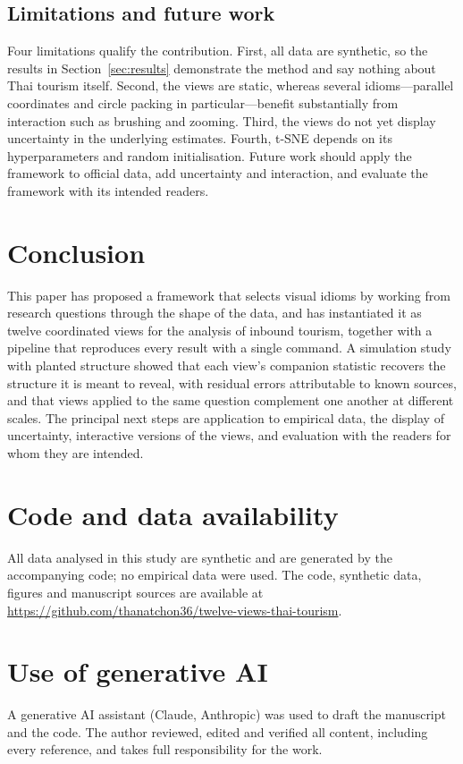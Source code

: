 \documentclass[11pt,a4paper]{article}
\begin{document}
\subsection{Limitations and future work}
Four limitations qualify the contribution. First, all data are synthetic, so the results in
Section~\ref{sec:results} demonstrate the method and say nothing about Thai tourism itself. Second, the views
are static, whereas several idioms---parallel coordinates and circle packing in particular---benefit
substantially from interaction such as brushing and zooming. Third, the views do not yet display uncertainty
in the underlying estimates. Fourth, t-SNE depends on its hyperparameters and random initialisation. Future
work should apply the framework to official data, add uncertainty and interaction, and evaluate the framework
with its intended readers.

\section{Conclusion}\label{sec:conclusion}

This paper has proposed a framework that selects visual idioms by working from research questions through the
shape of the data, and has instantiated it as twelve coordinated views for the analysis of inbound tourism,
together with a pipeline that reproduces every result with a single command. A simulation study with planted
structure showed that each view's companion statistic recovers the structure it is meant to reveal, with
residual errors attributable to known sources, and that views applied to the same question complement one
another at different scales. The principal next steps are application to empirical data, the display of
uncertainty, interactive versions of the views, and evaluation with the readers for whom they are intended.

\section*{Code and data availability}
All data analysed in this study are synthetic and are generated by the accompanying code; no empirical data
were used. The code, synthetic data, figures and manuscript sources are available at
\url{https://github.com/thanatchon36/twelve-views-thai-tourism}.

\section*{Use of generative AI}
A generative AI assistant (Claude, Anthropic) was used to draft the manuscript and the code. The author
reviewed, edited and verified all content, including every reference, and takes full responsibility for
the work.
\end{document}
